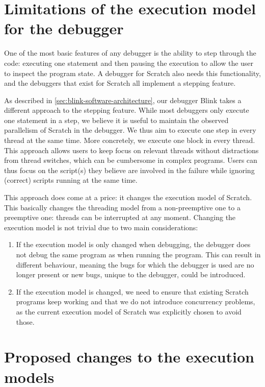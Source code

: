 \documentclass[../main]{subfiles}
\begin{document}
\section{Limitations of the execution model for the debugger}\label{sec:limitations-of-the-execution-model-for-the-debugger}

One of the most basic features of any debugger is the ability to step through the code: executing one statement and then pausing the execution to allow the user to inspect the program state.
A debugger for Scratch also needs this functionality, and the debuggers that exist for Scratch all implement a stepping feature.

As described in \vref{sec:blink-software-architecture}, our debugger Blink takes a different approach to the stepping feature.
While most debuggers only execute one statement in a step, we believe it is useful to maintain the observed parallelism of Scratch in the debugger.
We thus aim to execute one step in every thread at the same time.
More concretely, we execute one block in every thread.
This approach allows users to keep focus on relevant threads without distractions from thread switches, which can be cumbersome in complex programs.
Users can thus focus on the script(s) they believe are involved in the failure while ignoring (correct) scripts running at the same time.

This approach does come at a price: it changes the execution model of Scratch.
This basically changes the threading model from a non-preemptive one to a preemptive one: threads can be interrupted at any moment.
Changing the execution model is not trivial due to two main considerations:

\begin{enumerate}
    \item If the execution model is only changed when debugging, the debugger does not debug the same program as when running the program.
        This can result in different behaviour, meaning the bugs for which the debugger is used are no longer present or new bugs, unique to the debugger, could be introduced.
    \item If the execution model is changed, we need to ensure that existing Scratch programs keep working and that we do not introduce concurrency problems, as the current execution model of Scratch was explicitly chosen to avoid those.
\end{enumerate}

\section{Proposed changes to the execution models}\label{sec:a-family-of-new-execution-models}
\end{document}
